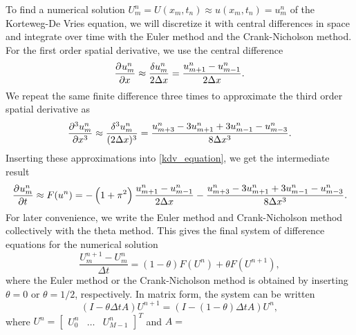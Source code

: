 \iffalse
\begin{equation*}
	\dpd{u}{t} = F\left(\dpd{u}{x}, \dpd[3]{u}{x}\right), \qquad \text{where} \,\, F\left(\dpd{u}{x}, \dpd[3]{u}{x}\right) = -\left(1+\pi^2\right) \dpd{u}{x} - \dpd[3]{u}{x}
\end{equation*}
\fi

To find a numerical solution $U_m^n = U(x_m, t_n) \approx u(x_m, t_n) = u_m^n$ of the Korteweg-De Vries equation, we will discretize it with central differences in space and integrate over time with the Euler method and the Crank-Nicholson method.
For the first order spatial derivative, we use the central difference
\begin{equation*}
	\dpd{u_m^n}{x}    \approx \frac{\delta u_m^n}{2 \Delta x}       = \frac{u_{m+1}^n-u_{m-1}^n}{2 \Delta x}.
\end{equation*}
We repeat the same finite difference three times to approximate the third order spatial derivative as 
\begin{equation*}
	\dpd[3]{u_m^n}{x} \approx \frac{\delta^3 u_m^n}{(2 \Delta x)^3} = \frac{u_{m+3}^n-3u_{m+1}^n+3u_{m-1}^n-u_{m-3}^n}{8 \Delta x^3}.
\end{equation*}
Inserting these approximations into \cref{kdv_equation}, we get the intermediate result
\begin{equation*}
	\dpd{u_m^n}{t} \approx F(u^n) = -\left(1+\pi^2\right) \frac{u_{m+1}^n-u_{m-1}^n}{2 \Delta x} - \frac{u_{m+3}^n-3u_{m+1}^n+3u_{m-1}^n-u_{m-3}^n}{8 \Delta x^3}.
\end{equation*}
For later convenience, we write the Euler method and Crank-Nicholson method collectively with the theta method.
This gives the final system of difference equations for the numerical solution
\begin{equation}\label{theta_method_discretized}
	\frac{U_m^{n+1} - U_m^n}{\Delta t} = (1-\theta) F(U^n) + \theta F(U^{n+1}),
\end{equation}
where the Euler method or the Crank-Nicholson method is obtained by inserting $\theta = 0$ or $\theta = 1/2$, respectively.
In matrix form, the system can be written
\begin{equation}
	\left(I - \theta \Delta t A\right) U^{n+1} = \left(I - \left(1-\theta\right) \Delta t A\right) U^n,
	\label{matrixeq}
\end{equation}
where $U^{n} = \begin{bmatrix} U_0^n & \dots & U_{M-1}^n \end{bmatrix}^T$ and $A = $
\newcommand\ca{\color{red}}
\newcommand\cb{\color{magenta}}
